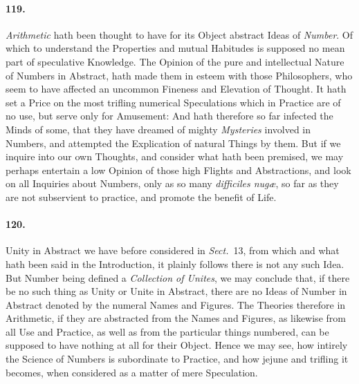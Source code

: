\documentclass[]{article}
\newenvironment{sectionbody}{\begin{multicols}{2}}{\end{multicols}}
\begin{document}
\begin{sectionbody}
\paragraph{119.} \emph{Arithmetic} hath been thought to have for its Object
abstract Ideas of \emph{Number}.  Of which to understand the
Properties and mutual Habitudes is supposed no mean part of
speculative Knowledge.  The Opinion of the pure and intellectual
Nature of Numbers in Abstract, hath made them in esteem with
those Philosophers, who seem to have affected an uncommon
Fineness and Elevation of Thought.  It hath set a Price on the
most trifling numerical Speculations which in Practice are of no
use, but serve only for Amusement: And hath therefore so far
infected the Minds of some, that they have dreamed of mighty
\emph{Mysteries} involved in Numbers, and attempted the
Explication of natural Things by them.  But if we inquire into
our own Thoughts, and consider what hath been premised, we may
perhaps entertain a low Opinion of those high Flights and
Abstractions, and look on all Inquiries about Numbers, only as so
many \emph{difficiles nug{\ae}}, so far as they are not
subservient to practice, and promote the benefit of Life.



\paragraph{120.} Unity in Abstract we have before considered in
\emph{Sect.}~13,
from which and what hath been said in the Introduction, it
plainly follows there is not any such Idea.  But Number being
defined a \emph{Collection of Unites}, we may conclude that, if
there be no such thing as Unity or Unite in Abstract, there are
no Ideas of Number in Abstract denoted by the numeral Names and
Figures.  The Theories therefore in Arithmetic, if they are
abstracted from the Names and Figures, as likewise from all Use
and Practice, as well as from the particular things numbered, can
be supposed to have nothing at all for their Object.  Hence we
may see, how intirely the Science of Numbers is subordinate to
Practice, and how jejune and trifling it becomes, when considered
as a matter of mere Speculation.




\end{sectionbody}
\end{document}
